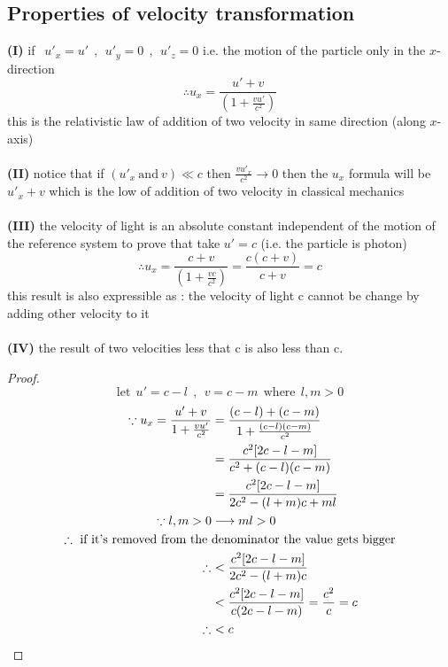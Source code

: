 \documentclass{article}
\begin{document}
\subsection{Properties of velocity transformation}
\textbf{(I)} if $\ \ u'_x = u' \ \ ,\ \ u'_y = 0 \ \ , \ \ u'_z = 0$ i.e. the motion of the particle only in the $x$-direction
\[
\therefore   u_x = \frac{u' + v}{\left(1 + \frac{vu'}{c^2}\right)}
\]
this is the relativistic law of addition of two velocity in same direction (along $x$-axis)
\\\\\textbf{(II)} notice that if $(u'_x \ \text{and} \ v) \ll c$ then $\frac{vu'_x}{c^2} \to 0$ then the $u_x$ formula will be $u'_x + v$ which is the low of addition of two velocity in classical mechanics
\\\\\textbf{(III)} the velocity of light is an absolute constant independent of the motion of the reference system to prove that take $u' = c$ (i.e. the particle is photon)
\[
\therefore u_x =  \frac{c + v}{\left(1 + \frac{vc}{c^2}\right)} = \frac{c(c+v)}{c+v} = c
\]
this result is also expressible as : the velocity of light c cannot be change by adding other velocity to it 
\\\\\textbf{(IV)} the result of two velocities less that c is also less than c.
\begin{proof}
    \[
        \text{let} \ \ u'=c-l \ \ , \ \ v=c-m \ \ \text{where} \ \ l,m>0
        \]
        \begin{align*}
            \because u_x = \frac{u' + v}{1 + \frac{vu'}{c^2}} &= \frac{(c-l) + (c-m)}{1 + \frac{(c-l)(c-m)}{c^2}}\\
                                                              &=\frac{c^2[2c-l-m]}{c^2+(c-l)(c-m)}\\
                                                              &=\frac{c^2[2c-l-m]}{2c^2-(l+m)c + ml}\\
                               \because l,m>0& \longrightarrow ml>0\\ 
                             \therefore \text{ if it's removed from the }&\text{denominator the value gets bigger}\\
                                                              &\hspace{-.35cm} \therefore \  <\frac{c^2[2c-l-m]}{2c^2-(l+m)c}\\
                                                              &<\frac{c^2[2c-l-m]}{c(2c-l-m)} = \frac{c^2}{c} = c\\
                                                              &\hspace{-.35cm} \therefore \  <c
        \end{align*}    
\end{proof}
\end{document}
